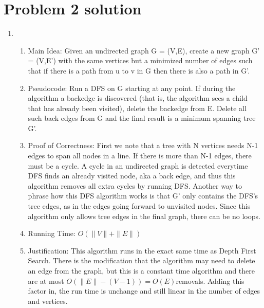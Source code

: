 \documentclass[11pt]{article}
\newenvironment{qparts}{\begin{enumerate}[{(}a{)}]}{\end{enumerate}}
\begin{document}
\section*{Problem 2 solution}
\begin{qparts}
\item
\begin{enumerate}
\item Main Idea: Given an undirected graph G = (V,E), create a new graph G' = (V,E') with the same vertices but a minimized number of edges such that if there is a path from u to v in G then there is also a path in G'.
\item Pseudocode: Run a DFS on G starting at any point. If during the algorithm a backedge is discovered (that is, the algorithm sees a child that has already been visited), delete the backedge from E. Delete all such back edges from G and the final result is a minimum spanning tree G'.
\item Proof of Correctness: First we note that a tree with N vertices needs N-1 edges to span all nodes in a line. If there is more than N-1 edges, there must be a cycle. A cycle in an undirected graph is detected everytime DFS finds an already visited node, aka a back edge, and thus this algorithm removes all extra cycles by running DFS. Another way to phrase how this DFS algorithm works is that G' only contains the DFS's tree edges, as in the edges going forward to unvisited nodes. Since this algorithm only allows tree edges in the final graph, there can be no loops.
\item Running Time: $O(\|V\|+\|E\|)$
\item Justification: This algorithm runs in the exact same time as Depth First Search. There is the modification that the algorithm may need to delete an edge from the graph, but this is a constant time algorithm and there are at most $O(\|E\| - (V-1)) = O(E) $removals. Adding this factor in, the run time is unchange and still linear in the number of edges and vertices.
\end{enumerate}


\end{qparts}
\end{document}
